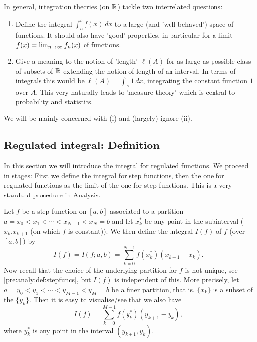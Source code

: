 \documentclass[10pt, a4paper]{article}
\begin{document}
In general,
integration theories
(on $\mathbb{R}$)
tackle two interrelated questions:
\begin{enumerate}[label = (\roman*)]
    \item Define the integral $\int_{a}^{b}f(x)\,dx$ to a large
    (and 'well-behaved')
    space of functions.
    It should also have 'good' properties,
    in particular for a limit $f(x) = \lim_{n \rightarrow \infty} f_n(x)$ of functions.

    \item Give a meaning to the notion of 'length' $\ell(A)$ for as large as possible class of subsets of $\mathbb{R}$ extending the notion of length of an interval.
    In terms of integrals this would be $\ell(A) = \int_A 1\,dx$,
    integrating the constant function $1$ over $A$.
    This very naturally leads to 'measure theory' which is central to probability and statistics.
\end{enumerate}

We will be mainly concerned with (i) and
(largely)
ignore (ii).

\subsection{Regulated integral: Definition}
In this section we will introduce the integral for regulated functions.
We proceed in stages:
First we define the integral for step functions,
then the one for regulated functions as the limit of the one for step functions.
This is a very standard procedure in Analysis.

\begin{definition}
    Let $f$ be a step function on $[a, b]$ associated to a partition $a = x_0 < x_1 < \dotsi < x_{N - 1} < x_N = b$ and let $x_k ^ {*}$ be any point in the subinterval
    ($x_k. x_{k + 1}$
    (on which $f$ is constant)).
    We then define the integral $I(f)$ of $f$
    (over $[a, b]$)
    by
    \[
    I(f) = I(f; a, b) = \sum_{k = 0}^{N - 1}f(x_k ^ {*})(x_{k + 1} - x_k).
    \]
    Now recall that the choice of the underlying partition for $f$ is not unique,
    see \autoref{pre:analy:def:stepfuncs},
    but $I(f)$ is independent of this.
    More precisely,
    let $a = y_0 < y_1 < \dotsi < y_{M -1} < y_M = b$ be a finer partition,
    that is,
    $\{x_k\}$ is a subset of the $\{y_k\}$.
    Then it is easy to visualise/see that we also have
    \[
    I(f) = \sum_{k = 0}^{M - 1}f(y_k ^ {*})(y_{k + 1} - y_k),
    \]
    where $y_k ^ {*}$ is any point in the interval $(y_{k + 1}, y_k)$.
\end{definition}
\end{document}
